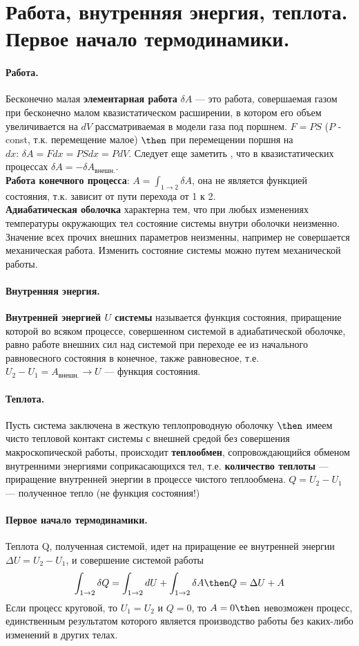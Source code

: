 \section{\normalsize Работа, внутренняя энергия, теплота. Первое начало термодинамики.}

\paragraph{Работа.} Бесконечно малая \textbf{элементарная работа} $\delta A$ --- это работа, совершаемая газом при бесконечно малом квазистатическом расширении, в котором его объем увеличивается на $dV$ рассматриваемая в модели газа под поршнем. $F = PS$ ($P$ - const, т.к. перемещение малое) $\then$ при перемещении поршня на $dx:\,\delta A = F dx= PSdx=PdV $. Следует еще заметить , что в квазистатических процессах $\delta A = - \delta A_\text{внешн.}$.\\
\textbf{Работа конечного процесса}: $A = \int_{1 \rightarrow 2} \delta A $, она не является функцией состояния, т.к. зависит от пути перехода от 1 к 2.\\
\textbf{Адиабатическая оболочка} характерна тем, что при любых изменениях температуры окружающих тел состояние системы внутри оболочки неизменно. Значение всех прочих внешних параметров неизменны, например не совершается механическая работа. Изменить состояние системы можно путем механической работы.
\paragraph{Внутренняя энергия.} \textbf{Внутренней энергией $U$ системы} называется функция состояния, приращение которой во всяком процессе, совершенном системой в адиабатической оболочке, равно работе внешних сил над системой при переходе ее из начального равновесного состояния в конечное, также равновесное, т.е. $U_2 - U_1 = A_\text{внешн.} \rightarrow U$ --- функция состояния.
\paragraph{Теплота.} Пусть система заключена в жесткую теплопроводную оболочку $\then$ имеем чисто тепловой контакт системы  с внешней средой без совершения макроскопической работы, происходит \textbf{теплообмен}, сопровождающийся обменом внутренними энергиями соприкасающихся тел, т.е. \textbf{количество теплоты} --- приращение внутренней энергии в процессе чистого теплообмена. $Q = U_2 - U _1$ --- полученное тепло (не функция состояния!)
\paragraph{Первое начало термодинамики.} Теплота Q, полученная системой, идет на приращение ее внутренней энергии $\Delta U = U_2 - U_1$, и совершение системой работы
$$ \int_{1 \rightarrow 2}\delta Q = \int_{1 \rightarrow 2}dU + \int_{1 \rightarrow 2}\delta A \then Q = \Delta U + A$$
Если процесс круговой, то $U_1 = U_2$ и $Q=0$, то $A = 0 \then$ невозможен процесс, единственным результатом которого является производство работы без каких-либо изменений в других телах.
